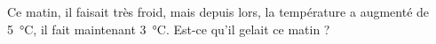 
\begin{exercice}\label{exo2smath-0059}

    Ce matin, il faisait très froid, mais depuis lors, la température a augmenté de \SI{5}{\celsius}, il fait maintenant \SI{3}{\celsius}. Est-ce qu'il gelait ce matin ?

\end{exercice}
